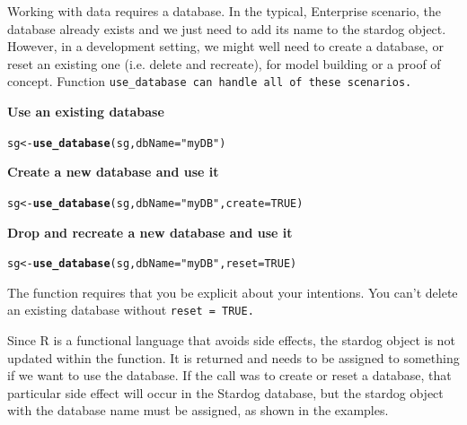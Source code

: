 \documentclass{article}\usepackage[]{graphicx}\usepackage[]{xcolor}
\makeatletter
\newcommand{\hlnum}[1]{\textcolor[rgb]{0.686,0.059,0.569}{#1}}%
\newcommand{\hlstr}[1]{\textcolor[rgb]{0.192,0.494,0.8}{#1}}%
\newcommand{\hlstd}[1]{\textcolor[rgb]{0.345,0.345,0.345}{#1}}%
\newcommand{\hlkwb}[1]{\textcolor[rgb]{0.69,0.353,0.396}{#1}}%
\newcommand{\hlkwc}[1]{\textcolor[rgb]{0.333,0.667,0.333}{#1}}%
\newcommand{\hlkwd}[1]{\textcolor[rgb]{0.737,0.353,0.396}{\textbf{#1}}}%
\newenvironment{kframe}{%
 \def\at@end@of@kframe{}%
 \ifinner\ifhmode%
  \def\at@end@of@kframe{\end{minipage}}%
  \begin{minipage}{\columnwidth}%
 \fi\fi%
 \def\FrameCommand##1{\hskip\@totalleftmargin \hskip-\fboxsep
 \colorbox{shadecolor}{##1}\hskip-\fboxsep
     \hskip-\linewidth \hskip-\@totalleftmargin \hskip\columnwidth}%
 \MakeFramed {\advance\hsize-\width
   \@totalleftmargin\z@ \linewidth\hsize
   \@setminipage}}%
 {\par\unskip\endMakeFramed%
 \at@end@of@kframe}
\newenvironment{knitrout}{}{} %
\makeatother
\begin{document}
Working with data requires a database. In the typical, Enterprise scenario, the database already exists and we just need to add its name to the stardog object. However, in a development setting, we might well need to create a database, or reset an existing one (i.e. delete and recreate), for model building or a proof of concept. Function \tt{use\_database} can handle all of these scenarios.

\bf{Use an existing database}

\begin{knitrout}
\color{fgcolor}\begin{kframe}
\begin{alltt}
\hlstd{sg} \hlkwb{<-} \hlkwd{use_database}\hlstd{(sg,} \hlkwc{dbName} \hlstd{=} \hlstr{"myDB"}\hlstd{)}
\end{alltt}
\end{kframe}
\end{knitrout}

\bf{Create a new database and use it}

\begin{knitrout}
\color{fgcolor}\begin{kframe}
\begin{alltt}
\hlstd{sg} \hlkwb{<-} \hlkwd{use_database}\hlstd{(sg,} \hlkwc{dbName} \hlstd{=} \hlstr{"myDB"}\hlstd{,} \hlkwc{create} \hlstd{=} \hlnum{TRUE}\hlstd{)}
\end{alltt}
\end{kframe}
\end{knitrout}

\bf{Drop and recreate a new database and use it}

\begin{knitrout}
\color{fgcolor}\begin{kframe}
\begin{alltt}
\hlstd{sg} \hlkwb{<-} \hlkwd{use_database}\hlstd{(sg,} \hlkwc{dbName} \hlstd{=} \hlstr{"myDB"}\hlstd{,} \hlkwc{reset} \hlstd{=} \hlnum{TRUE}\hlstd{)}
\end{alltt}
\end{kframe}
\end{knitrout}

The function requires that you be explicit about your intentions. You can't delete an existing database without \tt{reset = TRUE}.

Since R is a functional language that avoids side effects, the stardog object is not updated within the function. It is returned and needs to be assigned to something if we want to use the database. If the call was to create or reset a database, that particular side effect will occur in the Stardog database, but the stardog object with the database name must be assigned, as shown in the examples.
\end{document}
